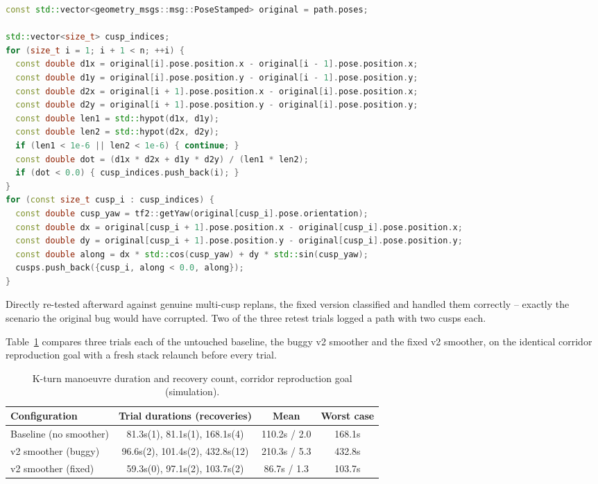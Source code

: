 \begin{lstlisting}[language=C++,caption={Cusp detection and reverse/forward classification, reading only from a read-only snapshot (\texttt{cusp\_straightener\_smoother.cpp}).},label={lst:cusp-detect}]
const std::vector<geometry_msgs::msg::PoseStamped> original = path.poses;

std::vector<size_t> cusp_indices;
for (size_t i = 1; i + 1 < n; ++i) {
  const double d1x = original[i].pose.position.x - original[i - 1].pose.position.x;
  const double d1y = original[i].pose.position.y - original[i - 1].pose.position.y;
  const double d2x = original[i + 1].pose.position.x - original[i].pose.position.x;
  const double d2y = original[i + 1].pose.position.y - original[i].pose.position.y;
  const double len1 = std::hypot(d1x, d1y);
  const double len2 = std::hypot(d2x, d2y);
  if (len1 < 1e-6 || len2 < 1e-6) { continue; }
  const double dot = (d1x * d2x + d1y * d2y) / (len1 * len2);
  if (dot < 0.0) { cusp_indices.push_back(i); }
}
for (const size_t cusp_i : cusp_indices) {
  const double cusp_yaw = tf2::getYaw(original[cusp_i].pose.orientation);
  const double dx = original[cusp_i + 1].pose.position.x - original[cusp_i].pose.position.x;
  const double dy = original[cusp_i + 1].pose.position.y - original[cusp_i].pose.position.y;
  const double along = dx * std::cos(cusp_yaw) + dy * std::sin(cusp_yaw);
  cusps.push_back({cusp_i, along < 0.0, along});
}
\end{lstlisting}

Directly re-tested afterward against genuine multi-cusp replans, the
fixed version classified and handled them correctly -- exactly the
scenario the original bug would have corrupted. Two of the three
retest trials logged a path with two cusps each.

Table~\ref{tab:cusp-trials} compares three trials each of the
untouched baseline, the buggy v2 smoother and the fixed v2 smoother,
on the identical corridor reproduction goal with a fresh stack
relaunch before every trial.

\begin{table}[htbp]
  \centering
  \caption{K-turn manoeuvre duration and recovery count, corridor reproduction goal (simulation).}
  \label{tab:cusp-trials}
  \begin{tabular}{@{}lccc@{}}
    \toprule
    Configuration & Trial durations (recoveries) & Mean & Worst case \\
    \midrule
    Baseline (no smoother) & 81.3s(1), 81.1s(1), 168.1s(4) & 110.2s / 2.0 & 168.1s \\
    v2 smoother (buggy) & 96.6s(2), 101.4s(2), 432.8s(12) & 210.3s / 5.3 & 432.8s \\
    v2 smoother (fixed) & 59.3s(0), 97.1s(2), 103.7s(2) & 86.7s / 1.3 & 103.7s \\
    \bottomrule
  \end{tabular}
\end{table}

